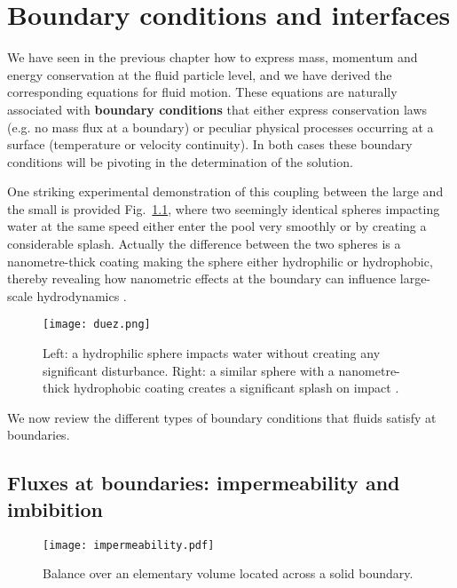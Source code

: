 \chapter[Boundary conditions and interfaces]{{\bfseries Boundary} conditions and {\bfseries interfaces}}
\label{chap:boundary_conditions}
We have seen in the previous chapter how to express mass, momentum and energy conservation at the fluid particle level, and we have derived the corresponding equations for fluid motion. These equations are naturally associated with \textbf{boundary conditions} that either express conservation laws (e.g. no mass flux at a boundary) or peculiar physical processes occurring at a surface (temperature or velocity continuity). In both cases these boundary conditions will be pivoting in the determination of the solution.

One striking experimental demonstration of this coupling between the large and the small is provided Fig.~\ref{fig:splash_no_splash}, where two seemingly identical spheres impacting water at the same speed either enter the pool very smoothly or by creating a considerable splash. Actually the difference between the two spheres is a nanometre-thick coating making the sphere either hydrophilic or hydrophobic, thereby revealing how nanometric effects at the boundary can influence large-scale hydrodynamics \citep{Duez2007,Eggers2007}.
\setlength{\unitlength}{1cm}
\begin{figure}[htbp]
\begin{center}
\texttt{[image: duez.png]}
\caption{Left: a hydrophilic sphere impacts water without creating any significant disturbance. Right: a similar sphere with a nanometre-thick hydrophobic coating creates a significant splash on impact \citep{Duez2007}.}
\label{fig:splash_no_splash}
\end{center}
\end{figure}

We now review the different types of boundary conditions that fluids satisfy at boundaries.
\section{Fluxes at boundaries: impermeability and imbibition}
\begin{figure}[htbp]
\begin{center}
\texttt{[image: impermeability.pdf]}
\caption{Balance over an elementary volume located across a solid boundary.}
\label{fig:impermeability}
\end{center}
\end{figure}

